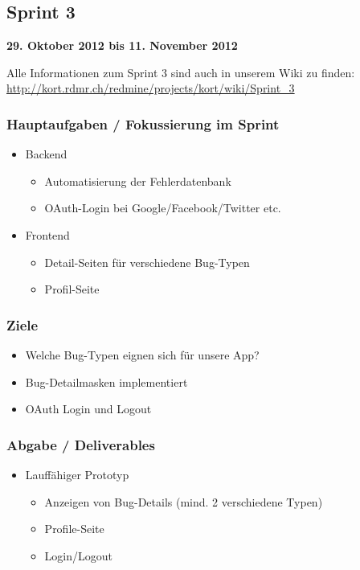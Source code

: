 \subsection{Sprint 3}

\textbf{29. Oktober 2012 bis 11. November 2012}

Alle Informationen zum Sprint 3 sind auch in unserem Wiki zu finden:
\url{http://kort.rdmr.ch/redmine/projects/kort/wiki/Sprint_3}

\subsubsection{Hauptaufgaben / Fokussierung im Sprint}

\begin{itemize}
	\item Backend
	\begin{itemize}
		\item Automatisierung der Fehlerdatenbank
		\item OAuth-Login bei Google/Facebook/Twitter etc.
	\end{itemize}
	\item Frontend
	\begin{itemize}
		\item Detail-Seiten für verschiedene Bug-Typen
		\item Profil-Seite
	\end{itemize}
\end{itemize}

\subsubsection{Ziele}
\begin{itemize}
	\item Welche Bug-Typen eignen sich für unsere App?
	\item Bug-Detailmasken implementiert
	\item OAuth Login und Logout
\end{itemize}

\subsubsection{Abgabe / Deliverables}

\begin{itemize}
	\item Lauffähiger Prototyp
	\begin{itemize}
		\item Anzeigen von Bug-Details (mind. 2 verschiedene Typen)
		\item Profile-Seite
		\item Login/Logout
	\end{itemize}
\end{itemize}

